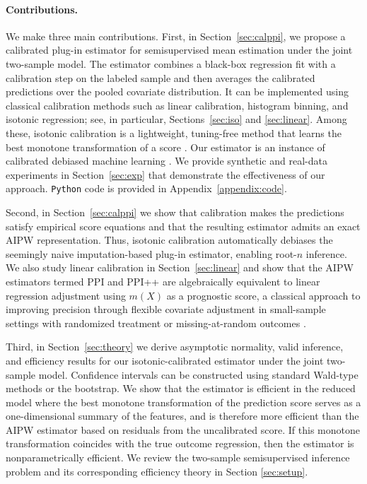\documentclass{article}
\theoremstyle{plain}
\theoremstyle{definition}
\newcommand{\1}{\mathbbm{1}}
\begin{document}
\paragraph{Contributions.}
We make three main contributions. First, in Section~\ref{sec:calppi}, we propose a calibrated plug-in estimator for semisupervised mean estimation under the joint two-sample model. The estimator combines a black-box regression fit with a calibration step on the labeled sample and then averages the calibrated predictions over the pooled covariate distribution. It can be implemented using classical calibration methods such as linear calibration, histogram binning, and isotonic regression; see, in particular, Sections~\ref{sec:iso} and \ref{sec:linear}. Among these, isotonic calibration is a lightweight, tuning-free method that learns the best monotone transformation of a score \citep{zadrozny2002transforming,niculescu2005predicting}. Our estimator is an instance of calibrated debiased machine learning \citep{van2024automatic}. We provide synthetic and real-data experiments in Section~\ref{sec:exp} that demonstrate the effectiveness of our approach. \texttt{Python} code is provided in Appendix~\ref{appendix:code}.

Second, in Section~\ref{sec:calppi} we show that calibration makes the predictions satisfy empirical score equations and that the resulting estimator admits an exact AIPW representation. Thus, isotonic calibration automatically debiases the seemingly naive imputation-based plug-in estimator, enabling root-\(n\) inference. We also study linear calibration in Section~\ref{sec:linear} and show that the AIPW estimators termed PPI and PPI++ are algebraically equivalent to linear regression adjustment using \(m(X)\) as a prognostic score, a classical approach to improving precision through flexible covariate adjustment in small-sample settings with randomized treatment or missing-at-random outcomes \citep{hansen2008prognostic,rosenblum2009using,hojbjerre2025powering}.  

Third, in Section~\ref{sec:theory} we derive asymptotic normality, valid inference, and efficiency results for our isotonic-calibrated estimator under the joint two-sample model. Confidence intervals can be constructed using standard Wald-type methods or the bootstrap. We show that the estimator is efficient in the reduced model where the best monotone transformation of the prediction score serves as a one-dimensional summary of the features, and is therefore more efficient than the AIPW estimator based on residuals from the uncalibrated score. If this monotone transformation coincides with the true outcome regression, then the estimator is nonparametrically efficient.  We review the two-sample semisupervised inference problem and its corresponding efficiency theory in Section \ref{sec:setup}.
\end{document}
